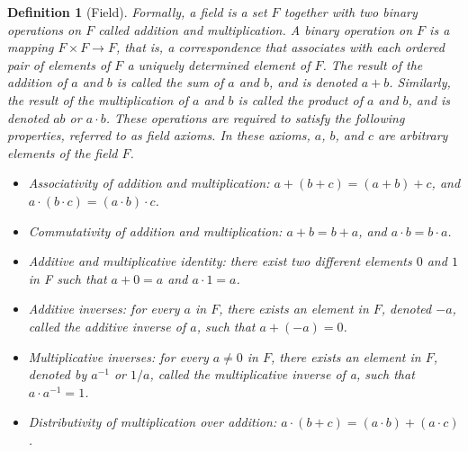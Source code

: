 \documentclass{article}
\theoremstyle{plain}
\newtheorem*{definition1}{Definition}
\theoremstyle{plain} %
\begin{document}
\begin{definition1}[Field]
Formally, a field is a set $F$ together with two binary operations on $F$ called addition and multiplication. A binary operation on $F$ is a mapping $F \times  F \to  F$, that is, a correspondence that associates with each ordered pair of elements of $F$ a uniquely determined element of $F$. The result of the addition of $a$ and $b$ is called the sum of $a$ and $b$, and is denoted $a + b$. Similarly, the result of the multiplication of $a$ and $b$ is called the product of $a$ and $b$, and is denoted $ab$ or $a \cdot  b$. These operations are required to satisfy the following properties, referred to as field axioms. In these axioms, $a$, $b$, and $c$ are arbitrary elements of the field $F$.

\begin{itemize}
\item Associativity of addition and multiplication: $a + (b + c) = (a + b) + c$, and $a \cdot (b \cdot c) = (a \cdot b) \cdot c$.
\item Commutativity of addition and multiplication: $a + b = b + a$, and $a \cdot b = b \cdot a$.
\item Additive and multiplicative identity: there exist two different elements $0$ and $1$ in F such that $a + 0 = a$ and $a \cdot 1 = a$.
\item Additive inverses: for every $a$ in $F$, there exists an element in $F$, denoted $-a$, called the additive inverse of $a$, such that $a + (-a) = 0$.
\item Multiplicative inverses: for every $a \neq  0$ in $F$, there exists an element in $F$, denoted by $a^{-1}$ or $1/a$, called the multiplicative inverse of a, such that $a \cdot a^{-1} = 1$.
\item Distributivity of multiplication over addition: $a \cdot (b + c) = (a \cdot b) + (a \cdot c)$.
\end{itemize}
\end{definition1}
\end{document}
